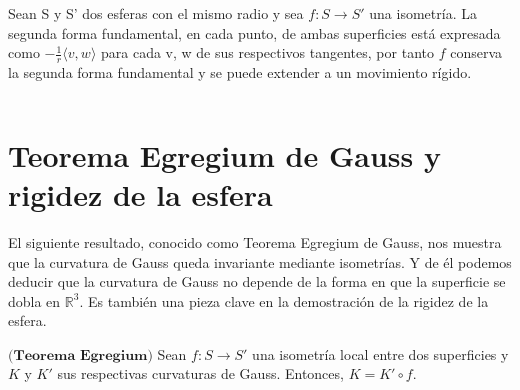 \begin{ejemplo}
	Sean S y S' dos esferas con el mismo radio y sea $f : S \to S'$ una isometría. La segunda forma fundamental, en cada punto, de ambas superficies está expresada como $-\frac{1}{r} \langle v,w \rangle$ para cada v, w de sus respectivos tangentes, por tanto $f$ conserva la segunda forma fundamental y se puede extender a un movimiento rígido.
\end{ejemplo}
${ }$\\


	${ }$\\
\section{Teorema Egregium de Gauss y rigidez de la esfera}
	${ }$\\

El siguiente resultado, conocido como Teorema Egregium de Gauss, nos muestra que la curvatura de Gauss queda invariante mediante isometrías. Y de él podemos deducir que la curvatura de Gauss no depende de la forma en que la superficie se dobla en $\mathbb{R}^3$. Es también una pieza clave en la demostración de la rigidez de la esfera.
${ }$\\

\begin{teorema} \label{teo:egre}
	$\textbf{(Teorema Egregium)}$ Sean $f : S \to S'$ una isometría local entre dos superficies y $K$ y $K'$ sus respectivas curvaturas de Gauss. Entonces, $K = K'\circ f$.
\end{teorema}

